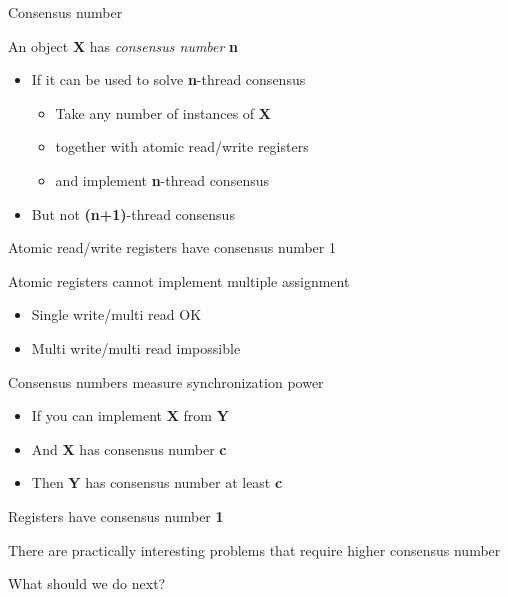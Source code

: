 \begin{frame}{Consensus number}

An object \textbf{X} has \textit{consensus number} \textbf{n}
\begin{itemize}
  \item If it can be used to solve \textbf{n}-thread consensus
  \begin{itemize}
    \item Take any number of instances of \textbf{X} 
    \item together with atomic read/write registers
    \item and implement \textbf{n}-thread consensus
  \end{itemize}
  \item But not \textbf{(n+1)}-thread consensus
\end{itemize}

\pause

\begin{theorem}
  Atomic read/write registers have consensus number 1
\end{theorem}

Atomic registers cannot implement multiple assignment
\begin{itemize}
  \item Single write/multi read OK
  \item Multi write/multi read impossible
\end{itemize}

\end{frame}

\begin{frame}{Consensus numbers measure synchronization power}

\begin{theorem}
\begin{itemize}
  \item If you can implement \textbf{X} from \textbf{Y}
  \item And \textbf{X} has consensus number \textbf{c}
  \item Then \textbf{Y} has consensus number at least \textbf{c}
\end{itemize}
\end{theorem}

\pause

Registers have consensus number \textbf{1}

\pause

There are practically interesting problems that require higher consensus number

\pause

What should we do next?

\end{frame}

